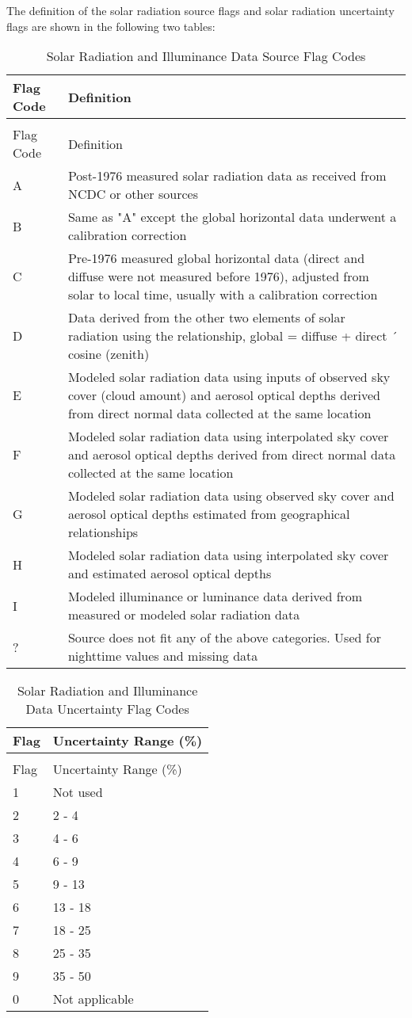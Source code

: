 The definition of the solar radiation source flags and solar radiation uncertainty flags are shown in the following two tables:

\begin{longtable}[c]{p{1.5in}p{4.5in}}
\caption{Solar Radiation and Illuminance Data Source Flag Codes \label{table:solar-radiation-and-illuminance-data-source}} \tabularnewline
\toprule 
Flag Code & Definition \tabularnewline \midrule
\endfirsthead

\caption[]{Solar Radiation and Illuminance Data Source Flag Codes} \tabularnewline
\toprule 
Flag Code & Definition \tabularnewline \midrule
\endhead

A & Post-1976 measured solar radiation data as received from NCDC or other sources \tabularnewline
B & Same as "A" except the global horizontal data underwent a calibration correction \tabularnewline
C & Pre-1976 measured global horizontal data (direct and diffuse were not measured before 1976), adjusted from solar to local time, usually with a calibration correction \tabularnewline
D & Data derived from the other two elements of solar radiation using the relationship, global = diffuse + direct ´ cosine (zenith) \tabularnewline
E & Modeled solar radiation data using inputs of observed sky cover (cloud amount) and aerosol optical depths derived from direct normal data collected at the same location \tabularnewline
F & Modeled solar radiation data using interpolated sky cover and aerosol optical depths derived from direct normal data collected at the same location \tabularnewline
G & Modeled solar radiation data using observed sky cover and aerosol optical depths estimated from geographical relationships \tabularnewline
H & Modeled solar radiation data using interpolated sky cover and estimated aerosol optical depths \tabularnewline
I & Modeled illuminance or luminance data derived from measured or modeled solar radiation data \tabularnewline
? & Source does not fit any of the above categories. Used for nighttime values and missing data \tabularnewline
\bottomrule
\end{longtable}

\begin{longtable}[c]{@{}ll@{}}
\caption{Solar Radiation and Illuminance Data Uncertainty Flag Codes \label{table:solar-radiation-and-illuminance-data}} \tabularnewline
\toprule 
Flag & Uncertainty Range (\%) \tabularnewline \midrule
\endfirsthead

\caption[]{Solar Radiation and Illuminance Data Uncertainty Flag Codes} \tabularnewline
\toprule 
Flag & Uncertainty Range (\%) \tabularnewline \midrule
\endhead

1 & Not used \tabularnewline
2 & 2 - 4 \tabularnewline
3 & 4 - 6 \tabularnewline
4 & 6 - 9 \tabularnewline
5 & 9 - 13 \tabularnewline
6 & 13 - 18 \tabularnewline
7 & 18 - 25 \tabularnewline
8 & 25 - 35 \tabularnewline
9 & 35 - 50 \tabularnewline
0 & Not applicable \tabularnewline
\bottomrule
\end{longtable}

